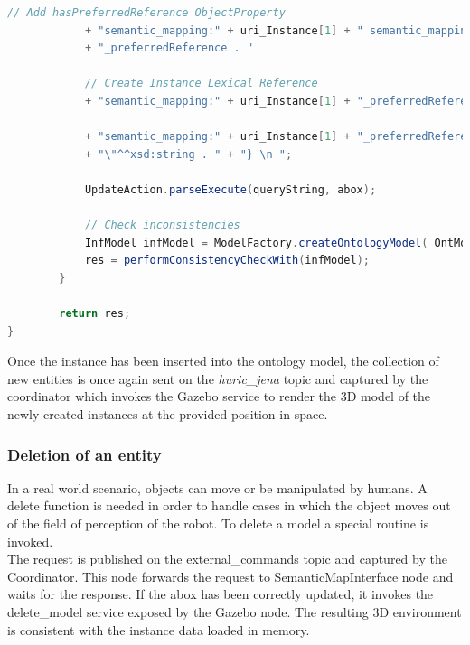 \begin{lstlisting}[language=Java]
			// Add hasPreferredReference ObjectProperty
			+ "semantic_mapping:" + uri_Instance[1] + " semantic_mapping_domain_model:hasPreferredReference semantic_mapping:" + uri_Instance[1]
			+ "_preferredReference . " 

			// Create Instance Lexical Reference
			+ "semantic_mapping:" + uri_Instance[1] + "_preferredReference rdf:type semantic_mapping_domain_model:PreferredReference . "

			+ "semantic_mapping:" + uri_Instance[1] + "_preferredReference semantic_mapping_domain_model:lexicalReference \"" + lexicalReference
			+ "\"^^xsd:string . " + "} \n ";
			
			UpdateAction.parseExecute(queryString, abox);
			
			// Check inconsistencies
		    InfModel infModel = ModelFactory.createOntologyModel( OntModelSpec.OWL_MEM_MICRO_RULE_INF, abox);
			res = performConsistencyCheckWith(infModel);
		}
	
		return res;
}
\end{lstlisting}

Once the instance has been inserted into the ontology model, the collection of new entities is once again sent on the \textit{huric\_jena} topic and captured by the coordinator which invokes the Gazebo service to render the 3D model of the newly created instances at the provided position in space.


\subsubsection{Deletion of an entity}
\label{subsubsec:delete}
In a real world scenario, objects can move or be manipulated by humans. A delete function is needed in order to handle cases in which the object moves out of the field of perception of the robot. To delete a model a special routine is invoked.\\
The request is published on the external\_commands topic and captured by the Coordinator. This node forwards the request to SemanticMapInterface node and waits for the response. If the abox has been correctly updated, it invokes the delete\_model service exposed by the Gazebo node. The resulting 3D environment is consistent with the instance data loaded in memory.

